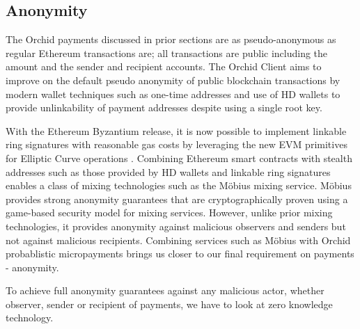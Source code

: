 \subsection{Anonymity}
\label{sec:anon}

The Orchid payments discussed in prior sections are as pseudo-anonymous as regular Ethereum transactions are; all transactions are public including the amount and the sender and recipient accounts. The Orchid Client aims to improve on the default pseudo anonymity of public blockchain transactions by modern wallet techniques such as one-time addresses \cite{AddressReuse} and use of HD wallets \cite{HDWallets} to provide unlinkability of payment addresses despite using a single root key.

With the Ethereum Byzantium release, it is now possible to implement linkable ring signatures with reasonable gas costs by leveraging the new EVM primitives for Elliptic Curve operations \cite{ETHRingSigs}. Combining Ethereum smart contracts with stealth addresses such as those provided by HD wallets and linkable ring signatures enables a class of mixing technologies such as the Möbius\cite{Moebius} mixing service. Möbius provides strong anonymity guarantees that are cryptographically proven using a game-based security model for mixing services. However, unlike prior mixing technologies, it provides anonymity against malicious observers and senders but not against malicious recipients. Combining services such as Möbius with Orchid probablistic micropayments brings us closer to our final requirement on payments - anonymity.

To achieve full anonymity guarantees against any malicious actor, whether observer, sender or recipient of payments, we have to look at zero knowledge technology.





